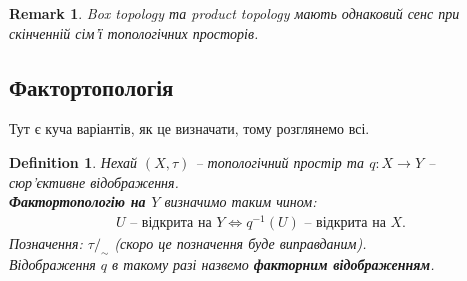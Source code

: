 \documentclass[a4paper, 10pt]{article}
\theoremstyle{theoremdd}
\newtheorem{definition}[theorem]{Definition}
\newtheorem{remark}[theorem]{Remark}
\begin{document}
\begin{remark}
Box topology та product topology мають однаковий сенс при скінченній сім'ї топологічних просторів.
\end{remark}

\subsection{Фактортопологія}
\noindent
Тут є куча варіантів, як це визначати, тому розглянемо всі.

\begin{definition}
Нехай $(X,\tau)$ -- топологічний простір та $q \colon X \to Y$ -- сюр'єктивне відображення.\\
\textbf{Фактортопологію на $Y$} визначимо таким чином:
\begin{align*}
U \text{ -- відкрита на } Y \iff q^{-1}(U) \text{ -- відкрита на } X.
\end{align*}
Позначення: $\tau/_\sim$ (скоро це позначення буде виправданим).\\
Відображення $q$ в такому разі назвемо \textbf{факторним відображенням}.
\end{definition}
\end{document}
